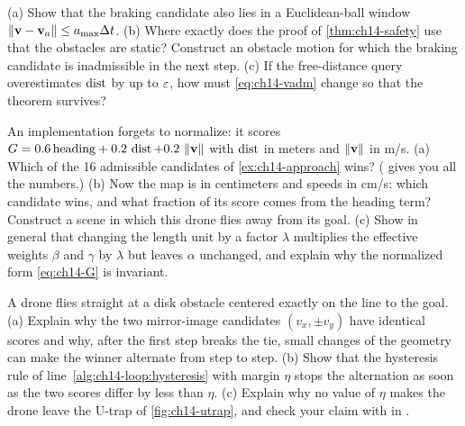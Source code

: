 \begin{exercise}[\difficulty{3}]
\label{exr:ch14-safety}
(a) Show that the braking candidate also lies in a Euclidean-ball window
$\left\lVert \mathbf{v} - \mathbf{v}_a \right\rVert \le a_{\max}\Delta t$. (b) Where exactly does the proof of
\cref{thm:ch14-safety} use that the obstacles are static? Construct an
obstacle motion for which the braking candidate is inadmissible in the next
step. (c) If the free-distance query overestimates $\operatorname{dist}$ by up to
$\varepsilon$, how must \cref{eq:ch14-vadm} change so that the theorem survives?
\end{exercise}

\begin{exercise}[\difficulty{2}]
\label{exr:ch14-units}
An implementation forgets to normalize: it scores
$G = 0.6\,\mathrm{heading} + 0.2\,\operatorname{dist} + 0.2\,\left\lVert \mathbf{v} \right\rVert$ with $\operatorname{dist}$ in
meters and $\left\lVert \mathbf{v} \right\rVert$ in m/s. (a) Which of the 16 admissible candidates
of \cref{ex:ch14-approach} wins? ( gives you all the
numbers.) (b) Now the map is in centimeters and speeds in cm/s: which
candidate wins, and what fraction of its score comes from the heading term?
Construct a scene in which this drone flies away from its goal. (c) Show in
general that changing the length unit by a
factor $\lambda$ multiplies the effective weights $\beta$ and $\gamma$ by
$\lambda$ but leaves $\alpha$ unchanged, and explain why the normalized form
\cref{eq:ch14-G} is invariant.
\end{exercise}

\begin{exercise}[\difficulty{2}]
\label{exr:ch14-hysteresis}
A drone flies straight at a disk obstacle centered exactly on the line to
the goal. (a) Explain why the two mirror-image candidates
$(v_x, \pm v_y)$ have identical scores and why, after the first step breaks
the tie, small changes of the geometry can make the winner alternate from
step to step. (b) Show that the hysteresis rule of
line~\ref{alg:ch14-loop:hysteresis} with margin $\eta$ stops the alternation
as soon as the two scores differ by less than $\eta$. (c) Explain why no
value of $\eta$ makes the drone leave the U-trap of \cref{fig:ch14-utrap},
and check your claim with  in
.
\end{exercise}

